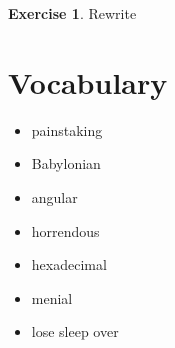 \documentclass[
]{book}
\providecommand{\tightlist}{%
  \setlength{\itemsep}{0pt}\setlength{\parskip}{0pt}}
\theoremstyle{definition}
\theoremstyle{definition}
\theoremstyle{definition}
\newtheorem{exercise}{Exercise}[chapter]
\theoremstyle{definition}
\theoremstyle{remark}
\begin{document}
\begin{exercise}
Rewrite
\end{exercise}

\section{Vocabulary}\label{vocabulary-3}

\begin{itemize}
\tightlist
\item
  painstaking
\item
  Babylonian
\item
  angular
\item
  horrendous
\item
  hexadecimal
\item
  menial
\item
  lose sleep over
\end{itemize}

  
\end{document}
